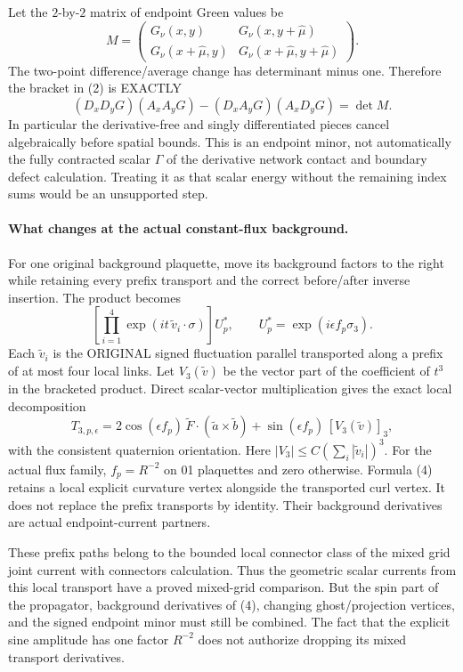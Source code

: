 \documentclass[11pt]{article}
\begin{document}
Let the $2$-by-$2$ matrix of endpoint Green values be
\[
 M=\begin{pmatrix}
 G_\nu(x,y)&G_\nu(x,y+\hat\mu)\\
 G_\nu(x+\hat\mu,y)&G_\nu(x+\hat\mu,y+\hat\mu)
 \end{pmatrix}.
\]
The two-point difference/average change has determinant minus one.
Therefore the bracket in (2) is EXACTLY
\[
 (D_xD_yG)(A_xA_yG)-(D_xA_yG)(A_xD_yG)=\det M.                    \tag{3}
\]
In particular the derivative-free and singly differentiated pieces
cancel algebraically before spatial bounds. This is an endpoint
minor, not automatically the fully contracted scalar $\Gamma$ of
the derivative network contact and boundary defect calculation. Treating it as that scalar energy without the remaining
index sums would be an unsupported step.

\paragraph{What changes at the actual constant-flux background.}
For one original background plaquette, move its background factors to
the right while retaining every prefix transport and the correct
before/after inverse insertion. The product becomes
\[
 \left[\prod_{i=1}^4\exp(i t\,\widetilde v_i\cdot\sigma)\right]
                    U_p^*,\qquad U_p^*=\exp(i\epsilon f_p\sigma_3).
\]
Each $\widetilde v_i$ is the ORIGINAL signed fluctuation parallel
transported along a prefix of at most four local links.
Let $V_3(\widetilde v)$ be the vector part of the coefficient of $t^3$
in the bracketed product. Direct scalar-vector multiplication gives
the exact local decomposition
\[
 T_{3,p,\epsilon}
 =2\cos(\epsilon f_p)\,
       \widetilde F\cdot(\widetilde a\times\widetilde b)
       +\sin(\epsilon f_p)\,[V_3(\widetilde v)]_3,                 \tag{4}
\]
with the consistent quaternion orientation.
Here $|V_3|\le C(\sum_i|\widetilde v_i|)^3$.
For the actual flux family, $f_p=R^{-2}$ on 01 plaquettes and zero
otherwise. Formula (4) retains a local explicit curvature vertex
alongside the transported curl vertex. It does not replace the
prefix transports by identity. Their background derivatives are
actual endpoint-current partners.

These prefix paths belong to the bounded local connector class of
the mixed grid joint current with connectors calculation. Thus the geometric scalar currents from this local transport
have a proved mixed-grid comparison. But the spin part of the
propagator, background derivatives of (4), changing ghost/projection
vertices, and the signed endpoint minor must still be combined.
The fact that the explicit sine amplitude has one factor $R^{-2}$
does not authorize dropping its mixed transport derivatives.
\end{document}
